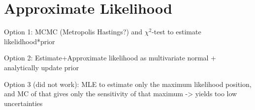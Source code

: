 \documentclass[10pt]{article}
\begin{document}
\section{Approximate Likelihood}

Option 1: MCMC (Metropolis Hastings?) and $\chi^2$-test to estimate likelidhood*prior

Option 2: Estimate+Approximate likelihood as multivariate normal + analytically update prior

Option 3 (did not work): MLE to estimate only the maximum likelihood position, and MC of that gives only the sensitivity of that maximum -> yields too low uncertainties



    
\end{document}
